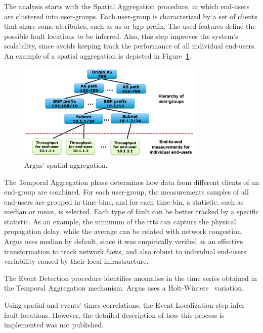 The analysis starts with the Spatial Aggregation procedure, in which
end-users are clustered into user-groups.
Each user-group is characterized by a set of clients that share some
attributes, such as \gls*{as} or \gls*{bgp} prefix.
The used features define the possible fault locations to be inferred.
Also, this step improves the system's
scalability, since avoids keeping track the performance of all individual
end-users.
An example of a spatial aggregation is depicted in
Figure~\ref{fig:argus_spatial_aggregation}.

\begin{figure}[H]
    \centering
    \includegraphics[width=0.8\textwidth]{./figures/literature_review/argus_spatial_aggregation.png}
    \caption{Argus' spatial aggregation.~\cite{argus_end_to_end_service_anomaly_detection_and_localization_from_an_isps_point_of_view}}
\label{fig:argus_spatial_aggregation}
\end{figure}%

The Temporal Aggregation phase determines how data
from different clients of an end-group are combined.
For each user-group, the
measurements samples of all end-users are grouped in time-bins, and for each
time-bin, a statistic, such as median or mean, is selected.
Each type of fault can be better tracked by a specific statistic.
As an example, the
minimum of the \glspl*{rtt} can capture the physical propagation delay,
while the average can be related with network congestion. Argus uses median
by default, since it was empirically verified as an
effective transformation to track network flaws, and also robust to individual
end-users variability caused by their local infrastructure.

The Event Detection procedure identifies anomalies in the
time series obtained in the Temporal Aggregation mechanism.
Argus uses a Holt-Winters~\cite{holt-winters_forecasting_some_practical_issues}
variation.

Using spatial and events' times correlations, the Event Localization step
infer fault locations.
However, the detailed description of how this
process is implemented was not published.

